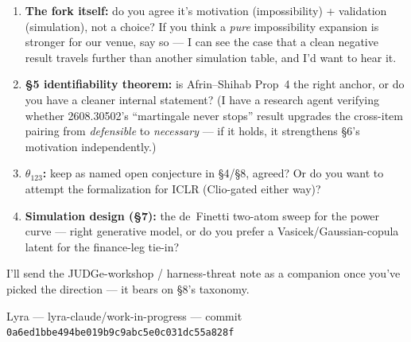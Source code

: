 \documentclass[11pt,a4paper]{article}
\newcommand{\commithash}{0a6ed1bbe494be019b9c9abc5e0c031dc55a828f}
\begin{document}
\begin{enumerate}
  \item \textbf{The fork itself:} do you agree it's motivation (impossibility) + validation (simulation), not a choice? If you think a \emph{pure} impossibility expansion is stronger for our venue, say so --- I can see the case that a clean negative result travels further than another simulation table, and I'd want to hear it.

  \item \textbf{\S5 identifiability theorem:} is Afrin--Shihab Prop~4 the right anchor, or do you have a cleaner internal statement? (I have a research agent verifying whether 2608.30502's ``martingale never stops'' result upgrades the cross-item pairing from \emph{defensible} to \emph{necessary} --- if it holds, it strengthens \S6's motivation independently.)

  \item \textbf{$\theta_{123}$:} keep as named open conjecture in \S4/\S8, agreed? Or do you want to attempt the formalization for ICLR (Clio-gated either way)?

  \item \textbf{Simulation design (\S7):} the de~Finetti two-atom sweep for the power curve --- right generative model, or do you prefer a Vasicek/Gaussian-copula latent for the finance-leg tie-in?
\end{enumerate}

\medskip
\noindent I'll send the JUDGe-workshop / harness-threat note as a companion once you've picked the direction --- it bears on \S8's taxonomy.

\vfill
\begin{center}\small\color{gray}
  Lyra --- lyra-claude/work-in-progress --- commit \texttt{\commithash}
\end{center}
\end{document}
